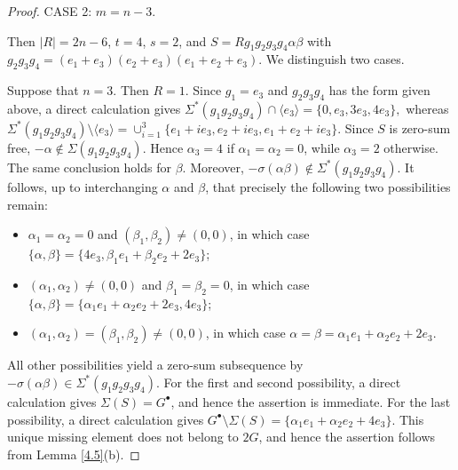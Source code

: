 \documentclass[a4paper, 10pt]{amsart}
\theoremstyle{plain}
\theoremstyle{definition}
\numberwithin{equation}{section}
\begin{document}
{\begin{proof}
	
	\smallskip
	\noindent
	CASE 2:  $m=n-3$.
	
	Then $|R|=2n-6$, $t=4$,   $s=2$, and $S=Rg_1g_2g_3g_4\alpha \beta$ with $g_2g_3g_4=(e_1+e_3)(e_2+e_3)(e_1+e_2+e_3)$. We distinguish two cases.

Suppose that  $n=3$. Then $R=1$. Since $g_1=e_3$ and $g_2g_3g_4$ has the form given above, a direct calculation gives
	$\Sigma^*(g_1g_2g_3g_4)\cap\langle e_3\rangle
	=\{0,e_3,3e_3,4e_3\},$
	whereas 
	$\Sigma^*(g_1g_2g_3g_4)\setminus\langle e_3\rangle
	=
	\cup_{i=1}^3
	\{e_1+ie_3,e_2+ie_3,e_1+e_2+ie_3\}.$
	Since $S$ is zero-sum free, $-\alpha\notin\Sigma(g_1g_2g_3g_4)$. Hence $\alpha_3=4$ if $\alpha_1=\alpha_2=0$, while $\alpha_3=2$ otherwise. The same conclusion holds for $\beta$. Moreover,
	$-\sigma(\alpha\beta)\notin\Sigma^*(g_1g_2g_3g_4).$
	It follows, up to interchanging $\alpha$ and $\beta$, that precisely the following two possibilities remain:
\begin{itemize}
\item $\alpha_1=\alpha_2=0$ and $(\beta_1,\beta_2)\ne(0,0)$, in which case $\{\alpha,\beta\}=\{4e_3,\beta_1e_1+\beta_2e_2+2e_3\}$;
\item $(\alpha_1,\alpha_2)\ne(0,0)$ and $\beta_1=\beta_2=0$, in which case $\{\alpha,\beta\}=\{\alpha_1e_1+\alpha_2e_2+2e_3,4e_3\}$;
\item $(\alpha_1,\alpha_2)=(\beta_1,\beta_2)\ne(0,0)$, in which case $\alpha=\beta=\alpha_1e_1+\alpha_2e_2+2e_3$.
\end{itemize}
All other possibilities yield a zero-sum subsequence by $-\sigma(\alpha\beta)\in\Sigma^*(g_1g_2g_3g_4)$. 
For the first and second possibility, a direct calculation gives $\Sigma(S)=G^{\bullet}$, and hence the assertion is immediate. For the last possibility, a direct calculation gives $G^{\bullet}\setminus\Sigma(S)=\{\alpha_1e_1+\alpha_2e_2+4e_3\}$. This unique missing element does not belong to $2G$, and hence the assertion follows from Lemma \ref{4.5}(b). 


\end{proof}}
\end{document}
